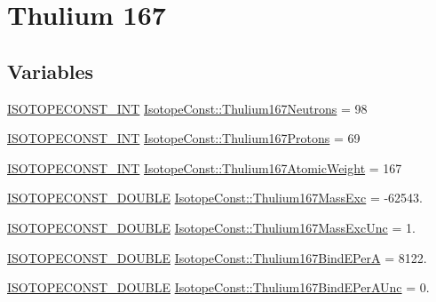 \hypertarget{group___isotope_const-_thulium-_tm167}{}\section{Thulium 167}
\label{group___isotope_const-_thulium-_tm167}
\subsection*{Variables}
\begin{DoxyCompactItemize}
\item 
\mbox{\hyperlink{group___isotope_const-_macros_ga5f18360b3e99483a35c32d789e62621c}{I\+S\+O\+T\+O\+P\+E\+C\+O\+N\+S\+T\+\_\+\+I\+NT}} \mbox{\hyperlink{group___isotope_const-_thulium-_tm167_ga81e1a5795991c0dbad4d01e7f12bee3e}{Isotope\+Const\+::\+Thulium167\+Neutrons}} = 98
\item 
\mbox{\hyperlink{group___isotope_const-_macros_ga5f18360b3e99483a35c32d789e62621c}{I\+S\+O\+T\+O\+P\+E\+C\+O\+N\+S\+T\+\_\+\+I\+NT}} \mbox{\hyperlink{group___isotope_const-_thulium-_tm167_ga0ff68da4ec8edd81013f21ca9ad8f8ec}{Isotope\+Const\+::\+Thulium167\+Protons}} = 69
\item 
\mbox{\hyperlink{group___isotope_const-_macros_ga5f18360b3e99483a35c32d789e62621c}{I\+S\+O\+T\+O\+P\+E\+C\+O\+N\+S\+T\+\_\+\+I\+NT}} \mbox{\hyperlink{group___isotope_const-_thulium-_tm167_ga2a5983fedacd095e4dfbdfb64279f0a2}{Isotope\+Const\+::\+Thulium167\+Atomic\+Weight}} = 167
\item 
\mbox{\hyperlink{group___isotope_const-_macros_ga8f45a7272ce02c0b4c65c44636ed719a}{I\+S\+O\+T\+O\+P\+E\+C\+O\+N\+S\+T\+\_\+\+D\+O\+U\+B\+LE}} \mbox{\hyperlink{group___isotope_const-_thulium-_tm167_ga604a479fbdc4ef2f1f2e73c6ef5f087d}{Isotope\+Const\+::\+Thulium167\+Mass\+Exc}} = -\/62543.
\item 
\mbox{\hyperlink{group___isotope_const-_macros_ga8f45a7272ce02c0b4c65c44636ed719a}{I\+S\+O\+T\+O\+P\+E\+C\+O\+N\+S\+T\+\_\+\+D\+O\+U\+B\+LE}} \mbox{\hyperlink{group___isotope_const-_thulium-_tm167_gada64dc2288cc6d2768db92ef115c292b}{Isotope\+Const\+::\+Thulium167\+Mass\+Exc\+Unc}} = 1.
\item 
\mbox{\hyperlink{group___isotope_const-_macros_ga8f45a7272ce02c0b4c65c44636ed719a}{I\+S\+O\+T\+O\+P\+E\+C\+O\+N\+S\+T\+\_\+\+D\+O\+U\+B\+LE}} \mbox{\hyperlink{group___isotope_const-_thulium-_tm167_gad4c02644ae4f1bcbd2b6652814f35270}{Isotope\+Const\+::\+Thulium167\+Bind\+E\+PerA}} = 8122.
\item 
\mbox{\hyperlink{group___isotope_const-_macros_ga8f45a7272ce02c0b4c65c44636ed719a}{I\+S\+O\+T\+O\+P\+E\+C\+O\+N\+S\+T\+\_\+\+D\+O\+U\+B\+LE}} \mbox{\hyperlink{group___isotope_const-_thulium-_tm167_ga7432a19e836c40c8946910a657653da5}{Isotope\+Const\+::\+Thulium167\+Bind\+E\+Per\+A\+Unc}} = 0.

\end{DoxyCompactItemize}
